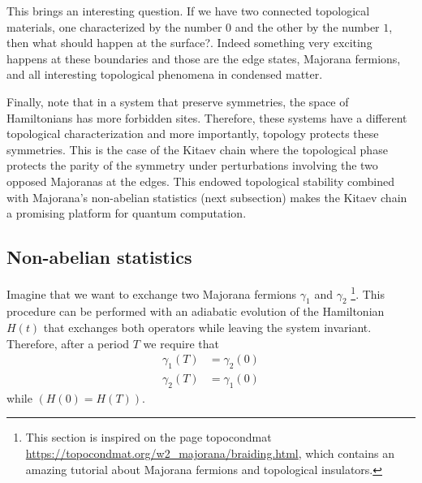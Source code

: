 This brings an interesting question. If we have two connected topological materials, one characterized by the  number $0$ and the other by the number $1$, then what should happen at the surface?. Indeed something very exciting happens at these boundaries and those are the edge states, Majorana fermions, and all interesting topological phenomena in condensed matter. 

Finally,  note that in a system that preserve symmetries, the space of Hamiltonians has more forbidden sites. Therefore, these systems have a different topological characterization and more importantly, topology protects these symmetries. This is the case of the Kitaev chain where the topological phase  protects the parity of the symmetry under perturbations involving the two opposed Majoranas at the edges. This endowed topological stability combined with Majorana's non-abelian statistics (next subsection) makes the Kitaev chain a promising platform for quantum computation. 





\subsection{Non-abelian statistics  \label{subsec:non-ab}}




Imagine that we want to exchange two Majorana fermions $\gamma_1$ and $\gamma_2$ \footnote{This section is inspired on the page topocondmat \url{https://topocondmat.org/w2_majorana/braiding.html}, which contains an amazing tutorial about Majorana fermions and topological insulators. }. This procedure can be performed with an adiabatic evolution of the Hamiltonian $H(t)$ that exchanges both operators while leaving the system invariant. Therefore, after a period $T$ we require that 
\begin{equation}
\begin{aligned}
\gamma_1(T) &= \gamma_2(0) \\
\gamma_2(T) &= \gamma_1(0) 
\end{aligned}
\label{eq:exchange}
\end{equation}
while  $\left(H(0)=H(T)\right)$. 



